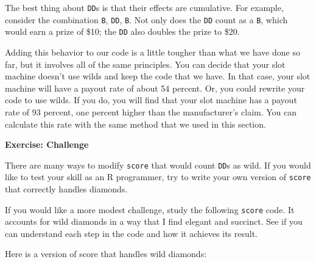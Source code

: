 \documentclass[
  letterpaper,
  DIV=11,
  numbers=noendperiod]{scrbook}
\begin{document}
The best thing about \texttt{DD}s is that their effects are cumulative.
For example, consider the combination \texttt{B}, \texttt{DD},
\texttt{B}. Not only does the \texttt{DD} count as a \texttt{B}, which
would earn a prize of \$10; the \texttt{DD} also doubles the prize to
\$20.

Adding this behavior to our code is a little tougher than what we have
done so far, but it involves all of the same principles. You can decide
that your slot machine doesn't use wilds and keep the code that we have.
In that case, your slot machine will have a payout rate of about 54
percent. Or, you could rewrite your code to use wilds. If you do, you
will find that your slot machine has a payout rate of 93 percent, one
percent higher than the manufacturer's claim. You can calculate this
rate with the same method that we used in this section.

\begin{tcolorbox}[enhanced jigsaw, left=2mm, breakable, colback=white, colframe=quarto-callout-color-frame, leftrule=.75mm, bottomrule=.15mm, arc=.35mm, opacityback=0, rightrule=.15mm, toprule=.15mm]

\vspace{-3mm}\textbf{Exercise: Challenge}\vspace{3mm}

There are many ways to modify \texttt{score} that would count
\texttt{DD}s as wild. If you would like to test your skill as an R
programmer, try to write your own version of \texttt{score} that
correctly handles diamonds.

If you would like a more modest challenge, study the following
\texttt{score} code. It accounts for wild diamonds in a way that I find
elegant and succinct. See if you can understand each step in the code
and how it achieves its result.

\end{tcolorbox}

Here is a version of score that handles wild diamonds:
\end{document}
